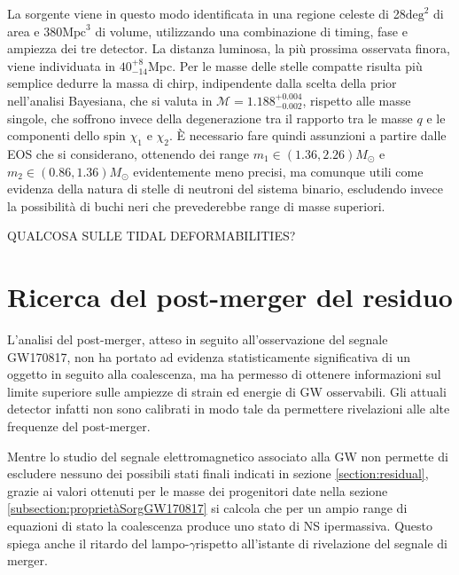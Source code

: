 La sorgente viene in questo modo identificata in una regione celeste di 28$\text{deg}^2$ di area e $380\text{Mpc}^3$ di volume, utilizzando una combinazione di timing, fase e ampiezza dei tre detector. La distanza luminosa, la più prossima osservata finora, viene individuata in $40_{-14}^{+8}$Mpc. Per le masse delle stelle compatte risulta più semplice dedurre la massa di chirp, indipendente dalla scelta della prior nell'analisi Bayesiana, che si valuta in $\mathcal{M}=1.188_{-0.002}^{+0.004}$, rispetto alle masse singole, che soffrono invece della degenerazione tra il rapporto tra le masse $q$ e le componenti dello spin $\chi_1$ e $\chi_2$. È necessario fare quindi assunzioni a partire dalle EOS che si considerano, ottenendo dei range $m_1 \in (1.36, 2.26)M_\odot$ e $m_2 \in (0.86, 1.36)M_\odot$ evidentemente meno precisi, ma comunque utili come evidenza della natura di stelle di neutroni del sistema binario, escludendo invece la possibilità di buchi neri che prevederebbe range di masse superiori\cite{Abbott_2017b}.

QUALCOSA SULLE TIDAL DEFORMABILITIES?


\section{Ricerca del post-merger del residuo}
\label{section:postmergerGW170817}

L'analisi del post-merger, atteso in seguito all'osservazione del segnale GW170817, non ha portato ad evidenza statisticamente significativa di un oggetto in seguito alla coalescenza, ma ha permesso di ottenere informazioni sul limite superiore sulle ampiezze di strain ed energie di GW osservabili. Gli attuali detector infatti non sono calibrati in modo tale da permettere rivelazioni alle alte frequenze del post-merger.

Mentre lo studio del segnale elettromagnetico associato alla GW non permette di escludere nessuno dei possibili stati finali indicati in sezione \ref{section:residual}, grazie ai valori ottenuti per le masse dei progenitori date nella sezione \ref{subsection:proprietàSorgGW170817} si calcola che per un ampio range di equazioni di stato la coalescenza produce uno stato di NS ipermassiva. Questo spiega anche il ritardo del lampo-$\gamma$rispetto all'istante di rivelazione del segnale di merger. 

